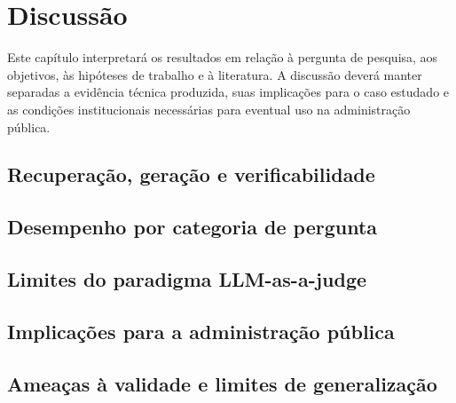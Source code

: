 \section{Discussão}
\label{sec:discussao}

Este capítulo interpretará os resultados em relação à pergunta de pesquisa, aos objetivos, às hipóteses de trabalho e à literatura. A discussão deverá manter separadas a evidência técnica produzida, suas implicações para o caso estudado e as condições institucionais necessárias para eventual uso na administração pública.

\subsection{Recuperação, geração e verificabilidade}


\subsection{Desempenho por categoria de pergunta}


\subsection{Limites do paradigma LLM-as-a-judge}


\subsection{Implicações para a administração pública}


\subsection{Ameaças à validade e limites de generalização}

